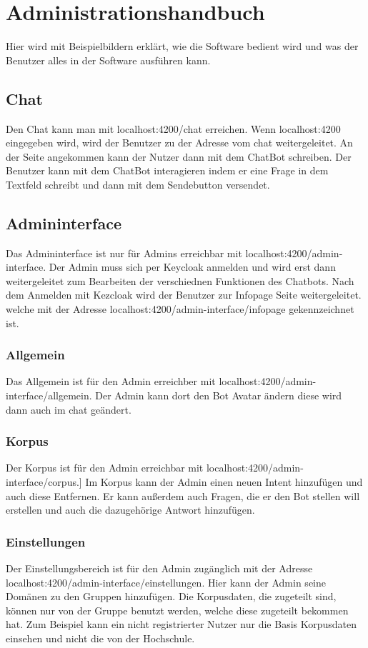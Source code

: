 \section{Administrationshandbuch}
Hier wird mit Beispielbildern erklärt, wie die Software bedient wird und was der Benutzer alles 
in der Software ausführen kann.

\subsection{Chat}
Den Chat kann man mit localhost:4200/chat erreichen. Wenn localhost:4200
eingegeben wird, wird der Benutzer zu der Adresse vom chat weitergeleitet.
An der Seite angekommen kann der Nutzer dann mit dem ChatBot schreiben. 
Der Benutzer kann mit dem ChatBot interagieren indem er eine Frage in dem Textfeld schreibt
und dann mit dem Sendebutton versendet.

\subsection{Admininterface}
Das Admininterface ist nur für Admins erreichbar mit localhost:4200/admin-interface. Der Admin muss sich per Keycloak
anmelden und wird erst dann weitergeleitet zum Bearbeiten der verschiednen Funktionen
des Chatbots.
Nach dem Anmelden mit Kezcloak wird der Benutzer zur Infopage Seite weitergeleitet.
welche mit der Adresse localhost:4200/admin-interface/infopage gekennzeichnet ist.

\subsubsection{Allgemein}
Das Allgemein ist für den Admin erreichber mit localhost:4200/admin-interface/allgemein. 
Der Admin kann dort den Bot Avatar ändern diese wird dann auch im chat geändert.

\subsubsection{Korpus}
Der Korpus ist für den Admin erreichbar mit localhost:4200/admin-interface/corpus.]
Im Korpus kann der Admin einen neuen Intent hinzufügen und auch diese Entfernen. 
Er kann außerdem auch Fragen, die er den Bot stellen will erstellen und auch die 
dazugehörige Antwort hinzufügen.

\subsubsection{Einstellungen}
Der Einstellungsbereich ist für den Admin zugänglich mit der Adresse 
localhost:4200/admin-interface/einstellungen.
Hier kann der Admin seine Domänen zu den Gruppen hinzufügen. Die Korpusdaten, die zugeteilt sind,
können nur von der Gruppe benutzt werden, welche diese zugeteilt bekommen hat. 
Zum Beispiel kann ein nicht registrierter Nutzer nur die Basis Korpusdaten einsehen und nicht die von der Hochschule.


